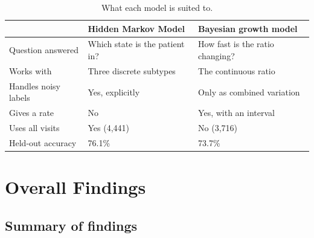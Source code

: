 \documentclass[11pt,a4paper]{article}
\begin{document}
\begin{table}[H]
\centering
\begin{tabular}{@{}lll@{}}
\toprule
 & \textbf{Hidden Markov Model} & \textbf{Bayesian growth model} \\
\midrule
Question answered      & Which state is the patient in? & How fast is the ratio changing? \\
Works with             & Three discrete subtypes        & The continuous ratio \\
Handles noisy labels   & Yes, explicitly                & Only as combined variation \\
Gives a rate           & No                             & Yes, with an interval \\
Uses all visits        & Yes (4{,}441)                  & No (3{,}716) \\
Held-out accuracy      & 76.1\%                         & 73.7\% \\
\bottomrule
\end{tabular}
\caption{What each model is suited to.}
\end{table}

\section{Overall Findings}

\subsection{Summary of findings}
\end{document}
